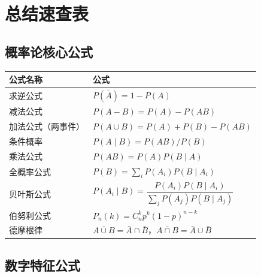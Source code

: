 \documentclass[12pt, a4paper]{article}
\begin{document}
\section*{总结速查表}

\subsection*{概率论核心公式}

\begin{center}
    \renewcommand{\arraystretch}{1.6}
    \begin{tabular}{ll}
        \toprule
        公式名称      & 公式                                                                              \\
        \midrule
        求逆公式      & $P(\bar{A})=1-P(A)$                                                             \\
        减法公式      & $P(A-B)=P(A)-P(AB)$                                                             \\
        加法公式（两事件） & $P(A\cup B)=P(A)+P(B)-P(AB)$                                                    \\
        条件概率      & $P(A\mid B)=P(AB)/P(B)$                                                         \\
        乘法公式      & $P(AB)=P(A)P(B\mid A)$                                                          \\
        全概率公式     & $P(B)=\sum_i P(A_i)P(B\mid A_i)$                                                \\
        贝叶斯公式     & $P(A_i\mid B)=\dfrac{P(A_i)P(B\mid A_i)}{\sum_j P(A_j)P(B\mid A_j)}$            \\
        伯努利公式     & $P_n(k)=C_n^k p^k(1-p)^{n-k}$                                                   \\
        德摩根律      & $\overline{A\cup B}=\bar{A}\cap\bar{B}$，$\overline{A\cap B}=\bar{A}\cup\bar{B}$ \\
        \bottomrule
    \end{tabular}
\end{center}

\subsection*{数字特征公式}
\end{document}
